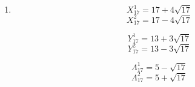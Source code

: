 \documentclass{article}
\begin{document}
\begin{enumerate}
\[ \omega_{16}^{4}=\omega_{4}^{1} \]
\[ \omega_{16}^{5}=\frac{-\sqrt{2-\sqrt{2}}+\sqrt{2+\sqrt{2}}i}{2} \]
\[ \omega_{16}^{6}=\omega_{8}^{3} \]

\[ \omega_{16}^{7}=\frac{-\sqrt{2+\sqrt{2}}+\sqrt{2-\sqrt{2}}i}{2} \]
\[ \omega_{16}^{8}=\omega_{2}^{1} \]
\[ \omega_{16}^{9}=\frac{-\sqrt{2+\sqrt{2}}-\sqrt{2-\sqrt{2}}i}{2} \]

\[ \omega_{16}^{10}=\omega_{8}^{5} \]
\[ \omega_{16}^{11}=\frac{-\sqrt{2-\sqrt{2}}-\sqrt{2+\sqrt{2}}i}{2} \]
\[ \omega_{16}^{12}=\omega_{4}^{3} \]

\[ \omega_{16}^{13}=\frac{\sqrt{2-\sqrt{2}}-\sqrt{2+\sqrt{2}}i}{2} \]
\[ \omega_{16}^{14}=\omega_{8}^{7} \]
\[ \omega_{16}^{15}=\frac{\sqrt{2+\sqrt{2}}-\sqrt{2-\sqrt{2}}i}{2} \]

\item \[ X_{17}^{1}=17+4\sqrt{17} \]
\[ X_{17}^{2}=17-4\sqrt{17} \]

\[ Y_{17}^{1}=13+3\sqrt{17} \]
\[ Y_{17}^{2}=13-3\sqrt{17} \]

\[ \Lambda_{17}^{1}=5-\sqrt{17} \]
\[ \Lambda_{17}^{2}=5+\sqrt{17} \]

\end{enumerate}
\end{document}
